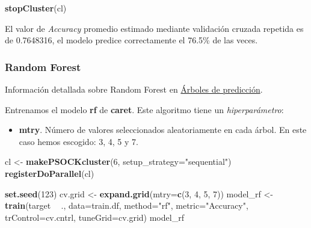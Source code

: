 \documentclass[]{article}
\newenvironment{Shaded}{\begin{snugshade}}{\end{snugshade}}
\newcommand{\DataTypeTok}[1]{\textcolor[rgb]{0.13,0.29,0.53}{#1}}
\newcommand{\DecValTok}[1]{\textcolor[rgb]{0.00,0.00,0.81}{#1}}
\newcommand{\KeywordTok}[1]{\textcolor[rgb]{0.13,0.29,0.53}{\textbf{#1}}}
\newcommand{\NormalTok}[1]{#1}
\newcommand{\OperatorTok}[1]{\textcolor[rgb]{0.81,0.36,0.00}{\textbf{#1}}}
\newcommand{\StringTok}[1]{\textcolor[rgb]{0.31,0.60,0.02}{#1}}
\providecommand{\tightlist}{%
  \setlength{\itemsep}{0pt}\setlength{\parskip}{0pt}}
\begin{document}
\begin{Shaded}
\begin{Highlighting}[]
\KeywordTok{stopCluster}\NormalTok{(cl)}
\end{Highlighting}
\end{Shaded}

El valor de \emph{Accuracy} promedio estimado mediante validación cruzada
repetida es de 0.7648316, el modelo predice correctamente el 76.5\% de
las veces.

\hypertarget{random-forest}{%
\subsubsection{Random Forest}\label{random-forest}}

Información detallada sobre Random Forest en
\href{https://www.cienciadedatos.net/documentos/33_arboles_de_prediccion_bagging_random_forest_boosting}{\color{blue}Árboles
de predicción}.

Entrenamos el modelo \textbf{rf} de \textbf{caret}. Este algoritmo tiene un \textit{hiperparámetro}:

\begin{itemize}
\tightlist
\item
  \textbf{mtry}. Número de valores seleccionados aleatoriamente en cada
  árbol. En este caso hemos escogido: 3, 4, 5 y 7.
\end{itemize}

\vspace{3mm}

\begin{Shaded}
\begin{Highlighting}[]
\NormalTok{cl <-}\StringTok{ }\KeywordTok{makePSOCKcluster}\NormalTok{(}\DecValTok{6}\NormalTok{, }\DataTypeTok{setup_strategy=}\StringTok{"sequential"}\NormalTok{)}
\KeywordTok{registerDoParallel}\NormalTok{(cl)}
\end{Highlighting}
\end{Shaded}

\begin{Shaded}
\begin{Highlighting}[]
\KeywordTok{set.seed}\NormalTok{(}\DecValTok{123}\NormalTok{)}
\NormalTok{cv.grid <-}\StringTok{ }\KeywordTok{expand.grid}\NormalTok{(}\DataTypeTok{mtry=}\KeywordTok{c}\NormalTok{(}\DecValTok{3}\NormalTok{, }\DecValTok{4}\NormalTok{, }\DecValTok{5}\NormalTok{, }\DecValTok{7}\NormalTok{))}
\NormalTok{model_rf <-}\StringTok{ }\KeywordTok{train}\NormalTok{(target }\OperatorTok{~}\StringTok{ }\NormalTok{., }\DataTypeTok{data=}\NormalTok{train.df,}
                      \DataTypeTok{method=}\StringTok{"rf"}\NormalTok{,}
                      \DataTypeTok{metric=}\StringTok{"Accuracy"}\NormalTok{,}
                      \DataTypeTok{trControl=}\NormalTok{cv.cntrl,}
                      \DataTypeTok{tuneGrid=}\NormalTok{cv.grid)}
\NormalTok{model_rf}
\end{Highlighting}
\end{Shaded}
\end{document}
